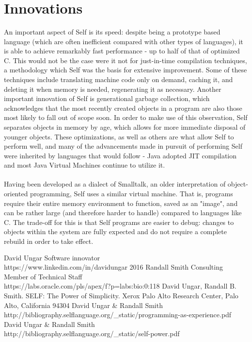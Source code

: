 \documentclass[12pt]{article}
\begin{document}
\section{Innovations}
\paragraph{} An important aspect of Self is its speed: despite being a prototype based language (which are often inefficient compared with other types of languages), it is able to achieve remarkably fast performance - up to half of that of optimized C. This would not be the case were it not for just-in-time compilation techniques, a methodology which Self was the basis for extensive improvement. Some of these techniques include translating machine code only on demand, caching it, and deleting it when memory is needed, regenerating it as necessary. Another important innovation of Self is generational garbage collection, which acknowledges that the most recently created objects in a program are also those most likely to fall out of scope soon. In order to make use of this observation, Self separates objects in memory by age, which allows for more immediate disposal of younger objects. These optimizations, as well as others are what allow Self to perform well, and many of the advancements made in pursuit of performing Self were inherited by languages that would follow - Java adopted JIT compilation and most Java Virtual Machines continue to utilize it. 

\paragraph{} Having been developed as a dialect of Smalltalk, an older interpretation of object-oriented programming, Self uses a similar virtual machine. That is, programs require their entire memory environment to function, saved as an "image", and can be rather large (and therefore harder to handle) compared to languages like C. The trade-off for this is that Self programs are easier to debug: changes to objects within the system are fully expected and do not require a complete rebuild in order to take effect. 

\begin{thebibliography}{9}
 David Ungar Software innovator\\ https://www.linkedin.com/in/davidungar 2016
 Randall Smith Consulting Member of Technical Staff \\ https://labs.oracle.com/pls/apex/f?p=labs:bio:0:118
 David Ungar, Randall B. Smith. SELF: The Power of Simplicity. Xerox Palo Alto Research Center, Palo Alto, California 94304
 David Ungar & Randall Smith \\ http://bibliography.selflanguage.org/_static/programming-as-experience.pdf
 David Ungar & Randall Smith \\ http://bibliography.selflanguage.org/_static/self-power.pdf
\end{thebibliography}
\end{document}
